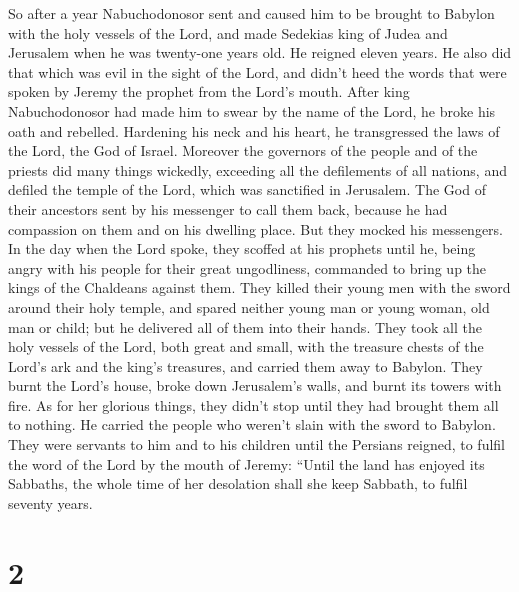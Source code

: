  So after a year Nabuchodonosor sent and caused him to be
brought to Babylon with the holy vessels of the Lord,  and
made Sedekias king of Judea and Jerusalem when he was twenty-one years
old. He reigned eleven years.  He also did that which was
evil in the sight of the Lord, and didn't heed the words that were
spoken by Jeremy the prophet from the Lord's mouth.  After
king Nabuchodonosor had made him to swear by the name of the Lord, he
broke his oath and rebelled. Hardening his neck and his heart, he
transgressed the laws of the Lord, the God of Israel. 
Moreover the governors of the people and of the priests did many things
wickedly, exceeding all the defilements of all nations, and defiled the
temple of the Lord, which was sanctified in Jerusalem.  The
God of their ancestors sent by his messenger to call them back, because
he had compassion on them and on his dwelling place.  But
they mocked his messengers. In the day when the Lord spoke, they scoffed
at his prophets  until he, being angry with his people for
their great ungodliness, commanded to bring up the kings of the
Chaldeans against them.  They killed their young men with
the sword around their holy temple, and spared neither young man or
young woman, old man or child; but he delivered all of them into their
hands.  They took all the holy vessels of the Lord, both
great and small, with the treasure chests of the Lord's ark and the
king's treasures, and carried them away to Babylon.  They
burnt the Lord's house, broke down Jerusalem's walls, and burnt its
towers with fire.  As for her glorious things, they didn't
stop until they had brought them all to nothing. He carried the people
who weren't slain with the sword to Babylon.  They were
servants to him and to his children until the Persians reigned, to
fulfil the word of the Lord by the mouth of Jeremy: 
``Until the land has enjoyed its Sabbaths, the whole time of her
desolation shall she keep Sabbath, to fulfil seventy years.

\hypertarget{section-1}{%
\section{2}\label{section-1}}

